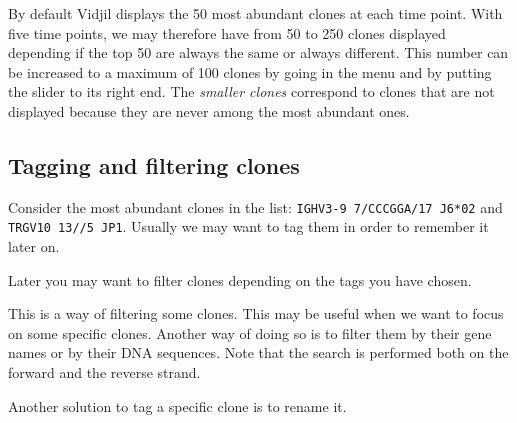 \documentclass[10pt]{article}
\begin{document}
By default Vidjil displays the 50 most abundant clones at each time point.
With five time points, we may therefore have from 50 to 250 clones displayed
depending if the top 50 are always the same or always different.
This number can be increased to a maximum of 100 clones by going in the  menu and by putting the
slider to its right end.
The \textit{smaller clones} correspond to clones that are not displayed
because they are never among the most abundant ones.


\subsection{Tagging and filtering clones}

Consider the most abundant clones in the list:  \texttt{IGHV3-9 7/CCCGGA/17 J6*02} and  \texttt{TRGV10 13//5 JP1}.
Usually we may want to tag them in order to remember it later on.

Later you may want to filter clones depending on the tags you have chosen.


This is a way of filtering some clones. This may be useful when we want to
focus on some specific clones. Another way of doing so is to filter them by
their gene names or by their DNA sequences.  
Note that the search is performed both on the forward and the reverse strand.

\bigskip

Another solution to tag a specific clone is to rename it.


\bigskip
\end{document}
